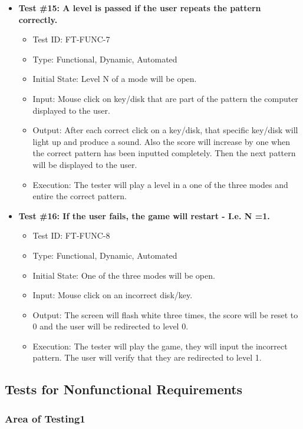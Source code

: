 \documentclass[12pt, titlepage]{article}
\begin{document}
\begin{itemize}
\item \textbf{Test \#15: A level is passed if the user repeats the pattern correctly.}
\begin{itemize}
\item Test ID: FT-FUNC-7
\item Type: Functional, Dynamic, Automated		
\item Initial State: Level N of a mode will be open. 					
\item Input: Mouse click on key/disk that are part of the pattern the computer displayed to the user.  		
\item Output: After each correct click on a key/disk, that specific key/disk will light up and produce a sound. Also the score will increase by one when the correct pattern has been inputted completely. Then the next pattern will be displayed to the user. 					
\item Execution: The tester will play a level in a one of the three modes and entire the correct pattern. 
\end{itemize}

\item \textbf{Test \#16: If the user fails, the game will restart - I.e. N =1.}
\begin{itemize}
\item Test ID: FT-FUNC-8
\item Type: Functional, Dynamic, Automated	
\item Initial State: One of the three modes will be open. 					
\item Input: Mouse click on an incorrect disk/key. 					
\item Output: The screen will flash white three times, the score will be reset to 0 and the user will be redirected to level 0.					
\item Execution: The tester will play the game, they will input the incorrect pattern. The user will verify that they are redirected to level 1.
\end{itemize}



\end{itemize}




\subsection{Tests for Nonfunctional Requirements}
\subsubsection{Area of Testing1}
\end{document}
